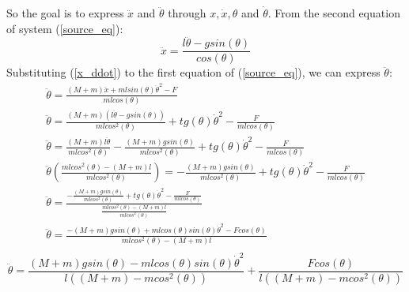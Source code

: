\documentclass[a4paper,12pt]{article}
\begin{document}
    So the goal is to express $\ddot x$ and $\ddot \theta$ through $x, \dot x, 
    \theta$ and $\dot \theta$. From the second equation of system (\ref{source_eq}):
    \begin{equation}\label{x_ddot}
        \ddot x = \frac{l\ddot\theta - gsin(\theta)}{cos(\theta)}
    \end{equation}
    Substituting (\ref{x_ddot}) to the first equation of (\ref{source_eq}), we can 
    express $\ddot{\theta}$:
    \begin{gather*}
        \ddot{\theta}=
        \frac
        {(M+m)\ddot{x}+mlsin(\theta)\dot \theta^2-F}
        {mlcos(\theta)}
        \\
        \ddot{\theta}=
        \frac
        {(M+m) (l\ddot \theta - gsin(\theta))}
        {mlcos^2(\theta)}
        +
        tg(\theta) \dot \theta^2
        - 
        \frac
        {F}
        {mlcos(\theta)}
        \\
        \ddot{\theta}=
        \frac
        {(M+m)l\ddot\theta}
        {mlcos^2(\theta)}
        - 
        \frac
        {(M+m)gsin(\theta)}
        {mlcos^2(\theta)}
        +
        tg(\theta) \dot \theta^2
        - 
        \frac
        {F}
        {mlcos(\theta)}
        \\
        \ddot{\theta}
        \left(
            \frac
            {mlcos^2(\theta)-(M+m)l}
            {mlcos^2(\theta)}
        \right)=
        - 
        \frac
        {(M+m)gsin(\theta)}
        {mlcos^2(\theta)}
        +
        tg(\theta)\dot \theta^2 
        -
        \frac
        {F}
        {mlcos(\theta)}
        \\
        \ddot\theta =
        \frac
        {-  \frac
            {(M+m)gsin(\theta)}
            {mlcos^2(\theta)}
            +
            tg(\theta)\dot \theta^2
            - 
            \frac
            {F}
            {mlcos(\theta)}
        }
        {
            \frac
            {mlcos^2(\theta)-(M+m)l}
            {mlcos^2(\theta)}
        }
        \\
        \ddot\theta = 
        \frac
        {-(M+m)gsin(\theta) + mlcos(\theta)sin(\theta)\dot\theta^2 - Fcos(\theta)}
        {mlcos^2(\theta)-(M+m)l}
        \\
    \end{gather*}
    \begin{equation}\label{theta_ddot}
        \ddot\theta = 
        \frac
        {(M+m)gsin(\theta) - mlcos(\theta)sin(\theta)\dot \theta^2}
        {l((M+m) - mcos^2(\theta))}
        +
        \frac
        {Fcos(\theta)}
        {l((M+m) - mcos^2(\theta))}
    \end{equation}
\end{document}
